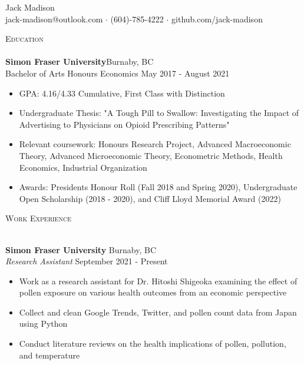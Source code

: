 \documentclass[]{article}
\newcommand{\lineunder} {
    \vspace*{-8pt} \\
    \hspace*{-18pt} \hrulefill \\
}
\newcommand{\header} [1] {
    {\hspace*{-18pt}\vspace*{6pt} \textsc{#1}}
    \vspace*{-6pt} \lineunder
}
\begin{document}
\vspace*{-40pt}

    

\vspace*{-10pt}
\begin{center}
	{\Huge {Jack Madison}}\\
	jack-madison@outlook.com $\cdot$ (604)-785-4222 $\cdot$ github.com/jack-madison\\
\end{center}

\header{Education}
\textbf{Simon Fraser University}\hfill Burnaby, BC\\
Bachelor of Arts Honours Economics \hfill May 2017 - August 2021\\
\begin{itemize}
    \item GPA: 4.16/4.33 Cumulative, First Class with Distinction
    \item Undergraduate Thesis: "A Tough Pill to Swallow: Investigating the Impact of Advertising to Physicians on Opioid Prescribing Patterns"
    \item Relevant coursework: Honours Research Project, Advanced Macroeconomic Theory, Advanced Microeconomic Theory, Econometric Methods, Health Economics, Industrial Organization
    \item Awards: Presidents Honour Roll (Fall 2018 and Spring 2020), Undergraduate Open Scholarship (2018 - 2020), and Cliff Lloyd Memorial Award (2022)
\end{itemize}

\vspace{2mm}

\header{Work Experience}
\vspace{1mm}

\textbf{Simon Fraser University} \hfill Burnaby, BC\\
\textit{Research Assistant} \hfill September 2021 - Present\\
\begin{itemize}
    \item Work as a research assistant for Dr. Hitoshi Shigeoka examining the effect of pollen exposure on various health outcomes from an economic perspective
    \item Collect and clean Google Trends, Twitter, and pollen count data from Japan using Python 
    \item Conduct literature reviews on the health implications of pollen, pollution, and temperature
\end{itemize}
\end{document}
